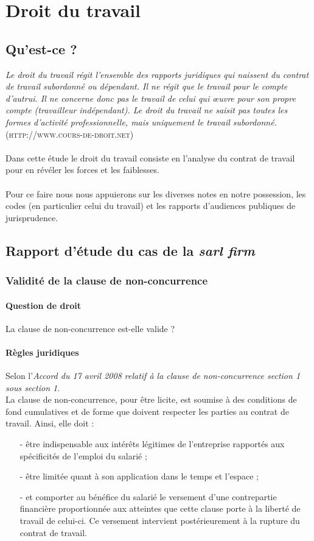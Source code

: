 \chapter{Droit du travail}
\thispagestyle{fancy} 

\section{Qu'est-ce ?}
\emph{   Le droit du travail régit l’ensemble des rapports juridiques qui naissent du contrat de travail subordonné ou dépendant. Il ne régit que le travail pour le compte d’autrui. Il ne concerne donc pas le travail de celui qui œuvre pour son propre compte (travailleur indépendant). Le droit du travail ne saisit pas toutes les formes d’activité professionnelle, mais uniquement le travail subordonné.}(\textsc{http://www.cours-de-droit.net}) \\\\
Dans cette étude le droit du travail consiste en l'analyse du contrat de travail pour en révéler les forces et les faiblesses.\\\\
Pour ce faire nous nous appuierons sur les diverses notes en notre possession, les codes (en particulier celui du travail) et les rapports d'audiences publiques de jurisprudence.

\section{Rapport d'étude du cas de la \emph{sarl firm}}
\subsection{Validité de la clause de non-concurrence}
\subsubsection{Question de droit}
La clause de non-concurrence est-elle valide ?
\subsubsection{Règles juridiques}
Selon l'\textit{Accord du 17 avril 2008 relatif à la clause de non-concurrence section 1 sous section 1}.\\
La clause de non-concurrence, pour être licite, est soumise à des conditions de fond cumulatives et de forme que doivent respecter les parties au contrat de travail.
Ainsi, elle doit :
\begin{itemize}
\item[-] être indispensable aux intérêts légitimes de l'entreprise rapportés aux spécificités de l'emploi du salarié ;
\item[-] être limitée quant à son application dans le temps et l'espace ;
\item[-] et comporter au bénéfice du salarié le versement d'une contrepartie financière proportionnée aux atteintes que cette clause porte à la liberté de travail de celui-ci. Ce versement intervient postérieurement à la rupture du contrat de travail.
\end{itemize}
